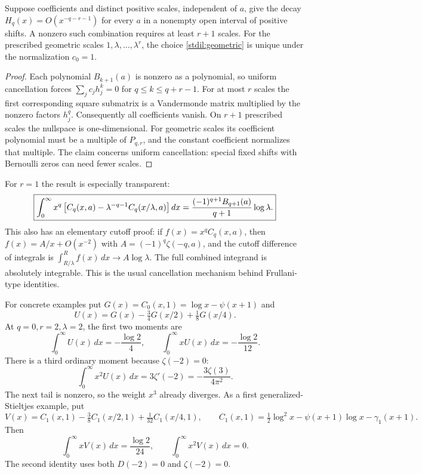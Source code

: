 \begin{proposition}
\label{stdil:minimal}
Suppose coefficients and distinct positive scales, independent of $a$,
give the decay $H_q(x)=O(x^{-q-r-1})$ for every $a$ in a nonempty
open interval of positive shifts. A nonzero such combination requires
at least $r+1$ scales. For the prescribed geometric scales
$1,\lambda,\ldots,\lambda^r$, the choice
\eqref{stdil:geometric} is unique under the normalization $c_0=1$.
\end{proposition}
\begin{proof}
Each polynomial $B_{k+1}(a)$ is nonzero as a polynomial, so uniform
cancellation forces $\sum_jc_jh_j^k=0$ for $q\le k\le q+r-1$.
For at most $r$ scales the first corresponding square submatrix is
a Vandermonde matrix multiplied by the nonzero factors $h_j^q$.
Consequently all coefficients vanish. On $r+1$ prescribed scales the
nullspace is one-dimensional. For geometric scales its coefficient
polynomial must be a multiple of $P_{q,r}$, and the constant coefficient
normalizes that multiple. The claim concerns uniform cancellation:
special fixed shifts with Bernoulli zeros can need fewer scales.
\end{proof}

For $r=1$ the result is especially transparent:
\begin{equation}\label{stdil:one}
 \boxed{\displaystyle
 \int_0^\infty x^q
  \left[C_q(x,a)-\lambda^{-q-1}C_q(x/\lambda,a)\right]dx
     ={(-1)^{q+1}B_{q+1}(a)\over q+1}\log\lambda.}
\end{equation}
This also has an elementary cutoff proof: if
$f(x)=x^qC_q(x,a)$, then $f(x)=A/x+O(x^{-2})$ with
$A=(-1)^q\zeta(-q,a)$, and the cutoff difference of integrals is
$\int_{R/\lambda}^{R}f(x)\,dx\longrightarrow A\log\lambda$.
The full combined integrand is absolutely integrable. This is the
usual cancellation mechanism behind Frullani-type identities.

For concrete examples put $G(x)=C_0(x,1)=\log x-\psi(x+1)$ and
\[
 U(x)=G(x)-\tfrac34G(x/2)+\tfrac18G(x/4).
\]
At $q=0,r=2,\lambda=2$, the first two moments are
\begin{equation}\label{stdil:digamma-pair}
 \int_0^\infty U(x)\,dx=-\frac{\log2}4,\qquad
 \int_0^\infty xU(x)\,dx=-\frac{\log2}{12}.
\end{equation}
There is a third ordinary moment because $\zeta(-2)=0$:
\begin{equation}\label{stdil:digamma-third}
 \int_0^\infty x^2U(x)\,dx
     =3\zeta'(-2)=-\frac{3\zeta(3)}{4\pi^2}.
\end{equation}
The next tail is nonzero, so the weight $x^3$ already diverges.
As a first generalized-Stieltjes example, put
\[
 V(x)=C_1(x,1)-\tfrac38C_1(x/2,1)+\tfrac1{32}C_1(x/4,1),
 \qquad C_1(x,1)=\tfrac12\log^2x-\psi(x+1)\log x-\gamma_1(x+1).
\]
Then
\begin{equation}\label{stdil:first-index}
 \int_0^\infty xV(x)\,dx=\frac{\log2}{24},\qquad
 \int_0^\infty x^2V(x)\,dx=0.
\end{equation}
The second identity uses both $D(-2)=0$ and $\zeta(-2)=0$.

